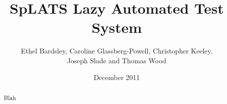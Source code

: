 \documentclass{report}
\title{SpLATS Lazy Automated Test System}
\author{Ethel Bardsley, Caroline Glassberg-Powell, Christopher Keeley,\\ Joseph Slade and Thomas Wood}
\date{December 2011}
\begin{document}
\maketitle

\begin{abstract}
Blah
\end{abstract}









\appendix
\end{document}

